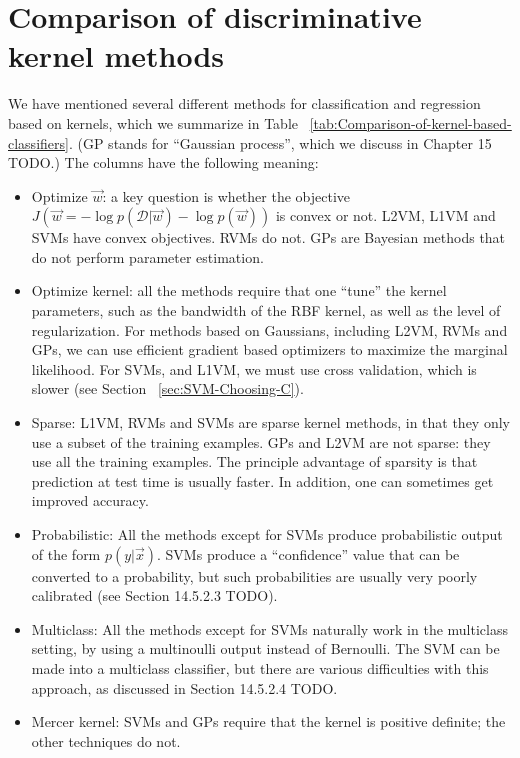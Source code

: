 \section{Comparison of discriminative kernel methods}
We have mentioned several different methods for classification and regression based on kernels, which we summarize in Table ~\ref{tab:Comparison-of-kernel-based-classifiers}. (GP stands for “Gaussian process”, which we discuss in Chapter 15 TODO.) The columns have the following meaning:
\begin{itemize}
\item{Optimize $\vec{w}$: a key question is whether the objective $J(\vec{w}=-\log p(\mathcal{D}|\vec{w})-\log p(\vec{w}))$ is convex or not. L2VM, L1VM and SVMs have convex objectives. RVMs do not. GPs are Bayesian methods that do not perform parameter estimation.}
\item{Optimize kernel: all the methods require that one “tune” the kernel parameters, such as the bandwidth of the RBF kernel, as well as the level of regularization. For methods based on Gaussians, including L2VM, RVMs and GPs, we can use efficient gradient based optimizers to maximize the marginal likelihood. For SVMs, and L1VM, we must use cross validation, which is slower (see Section ~\ref{sec:SVM-Choosing-C}).}
\item{Sparse: L1VM, RVMs and SVMs are sparse kernel methods, in that they only use a subset of the training examples. GPs and L2VM are not sparse: they use all the training examples. The principle advantage of sparsity is that prediction at test time is usually faster. In addition, one can sometimes get improved accuracy.}
\item{Probabilistic: All the methods except for SVMs produce probabilistic output of the form $p(y|\vec{x})$. SVMs produce a “confidence” value that can be converted to a probability, but such probabilities are usually very poorly calibrated (see Section 14.5.2.3 TODO).}
\item{Multiclass: All the methods except for SVMs naturally work in the multiclass setting, by using a multinoulli output instead of Bernoulli. The SVM can be made into a multiclass classifier, but there are various difficulties with this approach, as discussed in Section 14.5.2.4 TODO.}
\item{Mercer kernel: SVMs and GPs require that the kernel is positive definite; the other techniques do not.}
\end{itemize}

